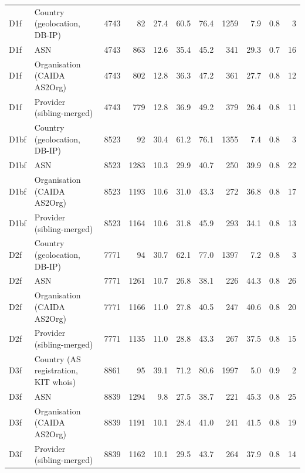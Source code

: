 \begin{table}[t]
{\begin{tabular}{llrrrrrrrrr}
D1f & Country (geolocation, DB-IP) & 4743 & 82 & 27.4 & 60.5 & 76.4 & 1259 & 7.9 & 0.8 & 3 \\
D1f & ASN & 4743 & 863 & 12.6 & 35.4 & 45.2 & 341 & 29.3 & 0.7 & 16 \\
D1f & Organisation (CAIDA AS2Org) & 4743 & 802 & 12.8 & 36.3 & 47.2 & 361 & 27.7 & 0.8 & 12 \\
D1f & Provider (sibling-merged) & 4743 & 779 & 12.8 & 36.9 & 49.2 & 379 & 26.4 & 0.8 & 11 \\
D1bf & Country (geolocation, DB-IP) & 8523 & 92 & 30.4 & 61.2 & 76.1 & 1355 & 7.4 & 0.8 & 3 \\
D1bf & ASN & 8523 & 1283 & 10.3 & 29.9 & 40.7 & 250 & 39.9 & 0.8 & 22 \\
D1bf & Organisation (CAIDA AS2Org) & 8523 & 1193 & 10.6 & 31.0 & 43.3 & 272 & 36.8 & 0.8 & 17 \\
D1bf & Provider (sibling-merged) & 8523 & 1164 & 10.6 & 31.8 & 45.9 & 293 & 34.1 & 0.8 & 13 \\
D2f & Country (geolocation, DB-IP) & 7771 & 94 & 30.7 & 62.1 & 77.0 & 1397 & 7.2 & 0.8 & 3 \\
D2f & ASN & 7771 & 1261 & 10.7 & 26.8 & 38.1 & 226 & 44.3 & 0.8 & 26 \\
D2f & Organisation (CAIDA AS2Org) & 7771 & 1166 & 11.0 & 27.8 & 40.5 & 247 & 40.6 & 0.8 & 20 \\
D2f & Provider (sibling-merged) & 7771 & 1135 & 11.0 & 28.8 & 43.3 & 267 & 37.5 & 0.8 & 15 \\
D3f & Country (AS registration, KIT whois) & 8861 & 95 & 39.1 & 71.2 & 80.6 & 1997 & 5.0 & 0.9 & 2 \\
D3f & ASN & 8839 & 1294 & 9.8 & 27.5 & 38.7 & 221 & 45.3 & 0.8 & 25 \\
D3f & Organisation (CAIDA AS2Org) & 8839 & 1191 & 10.1 & 28.4 & 41.0 & 241 & 41.5 & 0.8 & 19 \\
D3f & Provider (sibling-merged) & 8839 & 1162 & 10.1 & 29.5 & 43.7 & 264 & 37.9 & 0.8 & 14 \\
\bottomrule
\end{tabular}}
\end{table}
